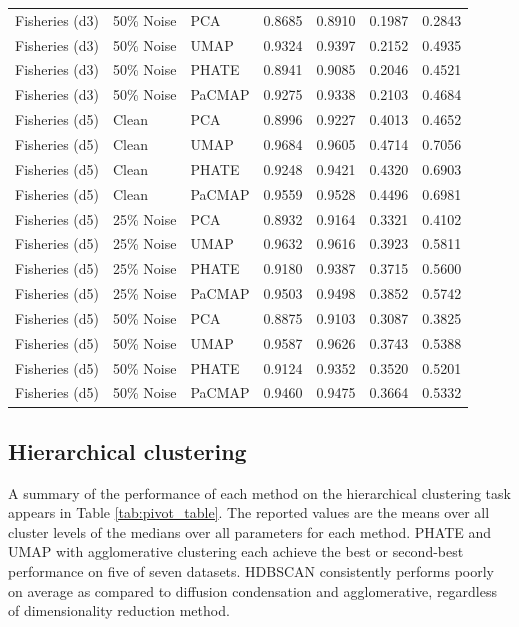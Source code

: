 \begin{table}[t]
\begin{tabular}{lllcccc}
    Fisheries (d3) & 50\% Noise & PCA & 0.8685 & 0.8910 & 0.1987 & 0.2843 \\
    Fisheries (d3) & 50\% Noise & UMAP & 0.9324 & 0.9397 & 0.2152 & 0.4935 \\
    Fisheries (d3) & 50\% Noise & PHATE & 0.8941 & 0.9085 & 0.2046 & 0.4521 \\
    Fisheries (d3) & 50\% Noise & PaCMAP & 0.9275 & 0.9338 & 0.2103 & 0.4684 \\
    
    Fisheries (d5) & Clean & PCA & 0.8996 & 0.9227 & 0.4013 & 0.4652 \\
    Fisheries (d5) & Clean & UMAP & 0.9684 & 0.9605 & 0.4714 & 0.7056 \\
    Fisheries (d5) & Clean & PHATE & 0.9248 & 0.9421 & 0.4320 & 0.6903 \\
    Fisheries (d5) & Clean & PaCMAP & 0.9559 & 0.9528 & 0.4496 & 0.6981 \\
    
    Fisheries (d5) & 25\% Noise & PCA & 0.8932 & 0.9164 & 0.3321 & 0.4102 \\
    Fisheries (d5) & 25\% Noise & UMAP & 0.9632 & 0.9616 & 0.3923 & 0.5811 \\
    Fisheries (d5) & 25\% Noise & PHATE & 0.9180 & 0.9387 & 0.3715 & 0.5600 \\
    Fisheries (d5) & 25\% Noise & PaCMAP & 0.9503 & 0.9498 & 0.3852 & 0.5742 \\
    
    Fisheries (d5) & 50\% Noise & PCA & 0.8875 & 0.9103 & 0.3087 & 0.3825 \\
    Fisheries (d5) & 50\% Noise & UMAP & 0.9587 & 0.9626 & 0.3743 & 0.5388 \\
    Fisheries (d5) & 50\% Noise & PHATE & 0.9124 & 0.9352 & 0.3520 & 0.5201 \\
    Fisheries (d5) & 50\% Noise & PaCMAP & 0.9460 & 0.9475 & 0.3664 & 0.5332 \\
    
    \bottomrule
    \end{tabular}
    \end{table}

\subsection{Hierarchical clustering}
A summary of the performance of each method on the hierarchical clustering task appears in Table \ref{tab:pivot_table}. The reported values are the means over all cluster levels of the medians over all parameters for each method. PHATE and UMAP with agglomerative clustering each achieve the best or second-best performance on five of seven datasets. HDBSCAN consistently performs poorly on average as compared to diffusion condensation and agglomerative, regardless of dimensionality reduction method.  

